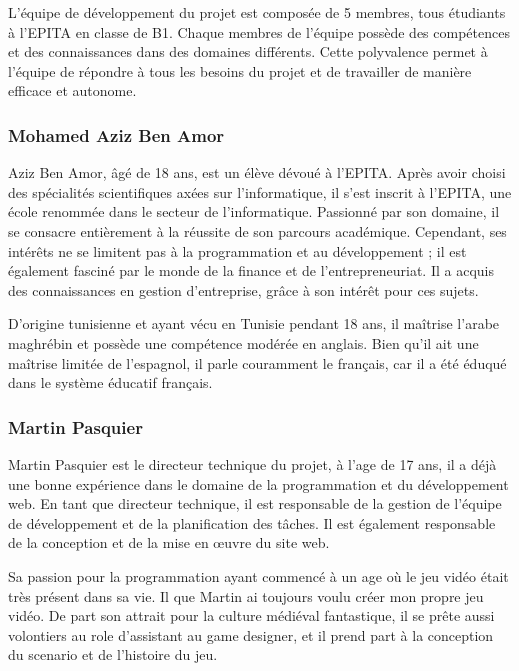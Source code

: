 
L'équipe de développement du projet est composée de 5 membres, tous étudiants à l'EPITA en classe de B1.
Chaque membres de l'équipe possède des compétences et des connaissances dans des domaines différents.
Cette polyvalence permet à l'équipe de répondre à tous les besoins du projet et de travailler de manière efficace et autonome.


\subsubsection*{Mohamed Aziz Ben Amor}

Aziz Ben Amor, âgé de 18 ans, est un élève dévoué à l'EPITA. 
Après avoir choisi des spécialités scientifiques axées sur l'informatique, il s'est inscrit à l'EPITA, une école renommée dans le secteur de l'informatique. 
Passionné par son domaine, il se consacre entièrement à la réussite de son parcours académique.
Cependant, ses intérêts ne se limitent pas à la programmation et au développement ; il est également fasciné par le monde de la finance et de l'entrepreneuriat. 
Il a acquis des connaissances en gestion d'entreprise, grâce à son intérêt pour ces sujets. 

D'origine tunisienne et ayant vécu en Tunisie pendant 18 ans, il maîtrise l'arabe maghrébin et possède une compétence modérée en anglais. 
Bien qu'il ait une maîtrise limitée de l'espagnol, il parle couramment le français, car il a été éduqué dans le système éducatif français.


\subsubsection*{Martin Pasquier}
    
Martin Pasquier est le directeur technique du projet, à l'age de 17 ans, il a déjà une bonne expérience dans le domaine de la programmation et du développement web.   
En tant que directeur technique, il est responsable de la gestion de l'équipe de développement et de la planification des tâches.
Il est également responsable de la conception et de la mise en œuvre du site web.

Sa passion pour la programmation ayant commencé à un age où le jeu vidéo était très présent dans sa vie.
Il  que Martin ai toujours voulu créer mon propre jeu vidéo.
De part son attrait pour la culture médiéval fantastique, il se prête aussi volontiers au role d'assistant au game designer, et il prend part à la conception du scenario et de l'histoire du jeu.

